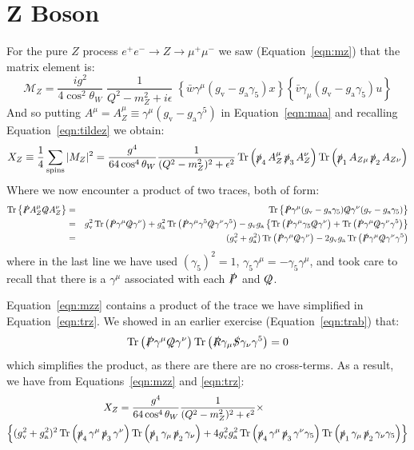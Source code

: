 \documentclass[12pt]{article}
\DeclareMathOperator{\Tr}{Tr}
\newcommand{\gv} {\ensuremath{g_{\mathrm v}}}
\newcommand{\ga} {\ensuremath{g_{\mathrm a}}}
\newcommand{\Ps} {\ensuremath{\slashed{P}}}
\newcommand{\Qs} {\ensuremath{\slashed{Q}}}
\newcommand{\Rs} {\ensuremath{\slashed{R}}}
\newcommand{\Ss} {\ensuremath{\slashed{S}}}
\newcommand{\ps}{\ensuremath{\slashed{p}}}
\begin{document}
\section{Z Boson}

For the pure $Z$ process $e^+e^- \to Z \to \mu^+\mu^-$ we saw (Equation~\ref{eqn:mz}) that the matrix element is:
\begin{equation}
\mathcal{M}_Z = \frac{ig^2}{4\cos^2\theta_W}\; \frac{1}{Q^2-m_Z^2+i\epsilon} \; \left\{ \bar{w} \gamma^\mu  (\gv-\ga\gamma_5) x \right\} \left\{ \bar{v} \gamma_\mu (\gv-\ga\gamma_5) u \right\}
\end{equation}
And so putting $A^\mu = A_Z^\mu \equiv \gamma^\mu(\gv-\ga\gamma^5)$ in Equation~\ref{eqn:maa} and recalling Equation~\ref{eqn:tildez} we obtain:
\begin{equation}
X_Z \equiv \frac{1}{4} \sum_{\rm spins} |M_Z|^2 = \frac{g^4}{64\cos^4\theta_W} \frac{1}{(Q^2-m_Z^2)^2+\epsilon^2}\Tr\left( \ps_4 \, A_Z^\mu \, \ps_3\, A_Z^\nu \right) \Tr\left( \ps_1 \, A_{Z\mu} \, \ps_2 \, A_{Z\nu} \right) \label{eqn:mzz}
\end{equation}
Where we now encounter a product of two traces, both of form:
\begin{eqnarray}
\Tr\left\{\Ps A_Z^\mu\Qs A_Z^\nu\right\} &=& \Tr\left\{\Ps\gamma^\mu(\gv-\ga\gamma_5)\Qs\gamma^\nu(\gv-\ga\gamma_5) \right\} \notag \\
&=& \gv^2 \Tr\left(\Ps\gamma^\mu\Qs\gamma^\nu\right)+\ga^2\Tr\left(\Ps\gamma^\mu\gamma^5\Qs\gamma^\nu\gamma^5\right)
-\gv\ga\left\{\Tr\left(\Ps\gamma^\mu\gamma_5\Qs\gamma^\nu\right)+\Tr\left(\Ps\gamma^\mu\Qs\gamma^\nu\gamma^5\right)\right\} \notag \\
&=& (\gv^2 + \ga^2) \Tr\left(\Ps\gamma^\mu\Qs\gamma^\nu\right)-2\gv\ga\Tr\left(\Ps\gamma^\mu\Qs\gamma^\nu\gamma^5\right) \label{eqn:trz}
\end{eqnarray}
where in the last line we have used $(\gamma_5)^2=1$, $\gamma_5\gamma^\mu=-\gamma_5\gamma^\mu$, and took care to recall that there is a $\gamma^\mu$ associated with each $\Ps$ and $\Qs$.

Equation~\ref{eqn:mzz} contains a product of the trace we have simplified in Equation~\ref{eqn:trz}.  We showed in an earlier exercise (Equation~\ref{eqn:trab})
that:
\begin{equation}
\Tr\left(\Ps\gamma^\mu\Qs\gamma^\nu\right) \Tr\left(\Rs\gamma_\mu\Ss\gamma_\nu\gamma^5\right) = 0 \label{eqn:trab}
\end{equation}
which simplifies the product, as there are there are no cross-terms.  As a result, we have from Equations~\ref{eqn:mzz} and \ref{eqn:trz}:
\begin{equation}
\begin{split}
X_Z  = \frac{g^4}{64\cos^4\theta_W} \frac{1}{(Q^2-m_Z^2)^2+\epsilon^2} \times \kern 5cm \\
\left\{ (\gv^2 + \ga^2)^2  \Tr\left( \ps_4 \, \gamma^\mu \, \ps_3\, \gamma^\nu \right) \Tr\left( \ps_1 \, \gamma_\mu \, \ps_2 \, \gamma_\nu \right)
+4\gv^2\ga^2\Tr\left( \ps_4 \, \gamma^\mu \, \ps_3\, \gamma^\nu \gamma_5\right) \Tr\left( \ps_1 \, \gamma_\mu \, \ps_2 \, \gamma_\nu \gamma_5 \right) \right\}
\end{split} \label{eqn:xzalmost}
\end{equation}
\end{document}

